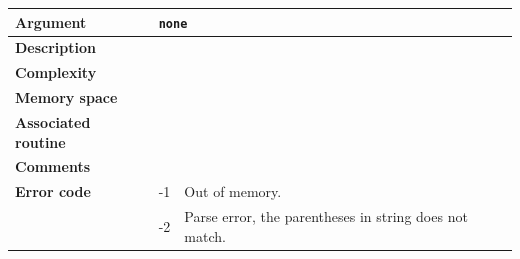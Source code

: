 \documentclass[11pt,a4paper]{article}
\theoremstyle{definition}
\theoremstyle{definition}
\numberwithin{equation}{section}
\begin{document}
\begin{enumerate}
		\begin{tabular}{>{\bfseries}lp{}p{}}
			\hline
			Argument & \multicolumn{2}{p{0.6\textwidth}}{\texttt{none}} \\
			\hline
			Description & \multicolumn{2}{p{0.6\textwidth}}{ } \\
			\hline
			Complexity&   &  \\
			Memory space&   &  \\
			\hline
			Associated routine&   & \\
			\hline
			Comments & \multicolumn{2}{p{0.6\textwidth}}{ } \\
			\hline
			Error code & -1 & Out of memory.\\
			& -2 & Parse error, the parentheses in string does not match.\\
			\hline
		\end{tabular}
	
	\end{enumerate}
	
	
\end{document}
